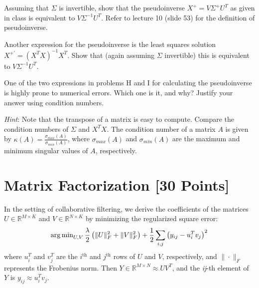 \problem[4] Assuming that $\Sigma$ is invertible, show that the pseudoinverse $X^+ = V\Sigma^+ U^T$ as given in class is equivalent to $V\Sigma^{-1} U^T$. Refer to lecture 10 (slide 53) for the definition of pseudoinverse.

\begin{solution}
\end{solution}

\problem[4] Another expression for the pseudoinverse is the least squares solution $X^{+'} = (X^T X)^{-1}X^T$. Show that (again assuming $\Sigma$ invertible) this is equivalent to $V\Sigma^{-1}U^T$.
\begin{solution}
\end{solution}

\problem[2] One of the two expressions in problems H and I for calculating the pseudoinverse is highly prone to numerical errors. Which one is it, and why? Justify your answer using condition numbers.

\textit{Hint}: Note that the transpose of a matrix is easy to compute. Compare the condition numbers of $\Sigma$ and $X^T X$. The condition number of a matrix $A$ is given by $\kappa(A) = \frac{\sigma_{max}(A)}{\sigma_{min}(A)}$, where $\sigma_{max}(A)$ and $\sigma_{min}(A)$ are the maximum and minimum singular values of $A$, respectively.

\begin{solution}

\end{solution}



\newpage
\section{Matrix Factorization [30 Points]}

In the setting of collaborative filtering, we derive the coefficients of the matrices $U \in \mathbb{R}^{M \times K}$ and $V \in \mathbb{R}^{N \times K}$ by minimizing the regularized square error:
$$\operatorname{arg\,min}_{U,V} \frac{\lambda}{2} \left( \|U\|_F^2 + \|V\|^2_F \right) + \frac{1}{2}\sum_{i,j} \left( y_{ij} - u_i^Tv_j\right)^2$$
where $u_i^T$ and $v_j^T$ are the $i^{\text{th}}$ and $j^{\text{th}}$ rows of $U$ and $V$, respectively, and $\|\cdot\|_F$ represents the Frobenius norm. Then $Y \in \mathbb{R}^{M \times N} \approx UV^T$, and the \textit{ij}-th element of $Y$ is $y_{ij} \approx u_i^Tv_j$.


